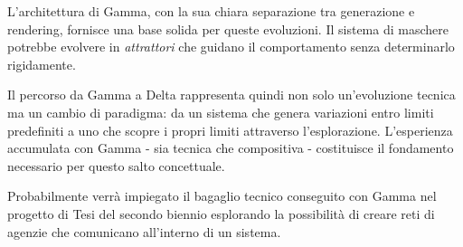 L'architettura di Gamma, con la sua chiara separazione tra generazione e rendering, fornisce una base solida per queste evoluzioni. Il sistema di maschere potrebbe evolvere in \textit{attrattori} che guidano il comportamento senza determinarlo rigidamente.

Il percorso da Gamma a Delta rappresenta quindi non solo un'evoluzione tecnica ma un cambio di paradigma: da un sistema che genera variazioni entro limiti predefiniti a uno che scopre i propri limiti attraverso l'esplorazione. L'esperienza accumulata con Gamma - sia tecnica che compositiva - costituisce il fondamento necessario per questo salto concettuale.

Probabilmente verrà impiegato il bagaglio tecnico conseguito con Gamma nel progetto di Tesi del secondo biennio esplorando la possibilità di creare reti di agenzie che comunicano all'interno di un sistema. 